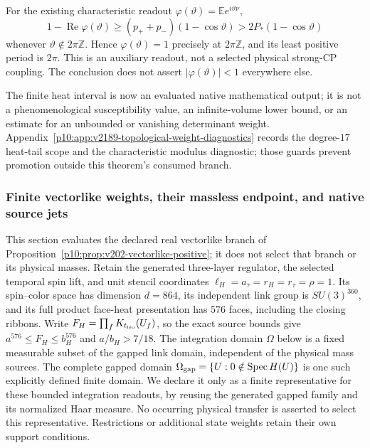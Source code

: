 \documentclass[12pt,a4paper]{article}
\begin{document}
\begin{corollary}
\label{p10:cor:next187-primitive-auxiliary-return}
For the existing characteristic readout $\varphi(\vartheta)=
\mathbb E e^{i\vartheta\nu}$,
\[
 1-\operatorname{Re}\varphi(\vartheta)
    \ge(p_++p_-)(1-\cos\vartheta)
    >2P_*(1-\cos\vartheta)
\]
whenever $\vartheta\notin2\pi\mathbb Z$. Hence
$\varphi(\vartheta)=1$ precisely at $2\pi\mathbb Z$, and its least positive
period is $2\pi$. This is an auxiliary readout, not a selected physical
strong-CP coupling. The conclusion does not assert
$|\varphi(\vartheta)|<1$ everywhere else.
\end{corollary}

The finite heat interval is now an evaluated native mathematical output;
it is not a phenomenological susceptibility value, an infinite-volume lower
bound, or an estimate for an unbounded or vanishing determinant weight.
Appendix~\ref{p10:app:v2189-topological-weight-diagnostics} records the degree-$17$ heat-tail scope and the characteristic
modulus diagnostic; those guards prevent promotion outside this theorem's
consumed branch.




\subsubsection{Finite vectorlike weights, their massless endpoint, and native source jets}
\label{p10:sec:v2189-native-weighted-topology}

This section evaluates the declared real vectorlike branch of
Proposition~\ref{p10:prop:v202-vectorlike-positive}; it does not select that
branch or its physical masses. Retain the generated three-layer regulator,
the selected temporal spin lift, and unit stencil coordinates
$\ell_H=a_\tau=r_H=r_\tau=\rho=1$. Its spin--color space has dimension
$d=864$, its independent link group is $SU(3)^{360}$, and its full product
face-heat presentation has $576$ faces, including the closing ribbons.
Write $F_H=\prod_fK_{t_{\rm iso}}(U_f)$, so the exact source bounds give
$a^{576}\le F_H\le b_H^{576}$ and $a/b_H>7/18$.
The integration domain $\Omega$ below is a fixed measurable subset of the
gapped link domain, independent of the physical mass sources. The complete
gapped domain $\Omega_{\rm gap}=\{U:0\notin\operatorname{Spec}H(U)\}$ is
one such explicitly defined finite domain. We declare it only as a finite
representative for these bounded integration readouts, by reusing the generated
gapped family and its normalized Haar measure. No occurring physical transfer
is asserted to select this representative. Restrictions or additional state
weights retain their own support conditions.
\end{document}
